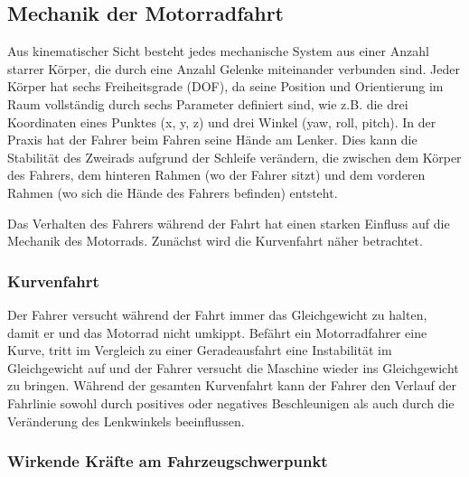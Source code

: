 \subsection{Mechanik der Motorradfahrt} %
Aus kinematischer Sicht besteht jedes mechanische System aus einer Anzahl starrer Körper, die durch eine Anzahl Gelenke miteinander verbunden sind. Jeder Körper hat sechs Freiheitsgrade (DOF), da seine Position und Orientierung im Raum vollständig durch sechs Parameter definiert sind, wie z.B. die drei Koordinaten eines Punktes (x, y, z) und drei Winkel (yaw, roll, pitch).
In der Praxis hat der Fahrer beim Fahren seine Hände am Lenker. Dies kann die Stabilität des Zweirads aufgrund der Schleife verändern, die zwischen dem Körper des Fahrers, dem hinteren Rahmen (wo der Fahrer sitzt) und dem vorderen Rahmen (wo sich die Hände des Fahrers befinden) entsteht.\citep{Cossalter2014}

Das Verhalten des Fahrers während der Fahrt hat einen starken Einfluss auf die Mechanik des Motorrads. Zunächst wird die Kurvenfahrt näher betrachtet.

\subsubsection{Kurvenfahrt} 

Der Fahrer versucht während der Fahrt immer das Gleichgewicht zu halten, damit er und das Motorrad nicht umkippt.
Befährt ein Motorradfahrer eine Kurve, tritt im Vergleich zu einer Geradeausfahrt eine Instabilität im Gleichgewicht auf und der Fahrer versucht die Maschine wieder ins Gleichgewicht zu bringen. Während der gesamten Kurvenfahrt kann der Fahrer den Verlauf der Fahrlinie sowohl durch positives oder negatives Beschleunigen als auch durch die Veränderung des Lenkwinkels beeinflussen. \citep{Haedrich2012} 


\subsubsection{Wirkende Kräfte am Fahrzeugschwerpunkt}

